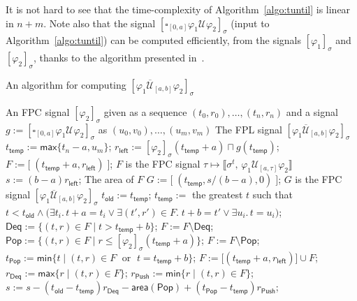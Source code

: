 \documentclass[envcountsect,orivec]{llncs} \usepackage{etex} \usepackage[]{graphicx}
\newcommand{\UntilOp}[1]{\mathbin{\mathcal{U}_{#1}}}
\newcommand{\TUntil}[1]{\mathbin{\overline{\mathcal{U}}_{#1}}}
\newcommand{\BoxOp}[1]{\square_{#1}}
\newcommand{\Robust}[2]{{ \llbracket #1,\, #2 \rrbracket}}
\newcommand{\Max}{\mathsf{max}}
\newcommand{\Min}{\mathsf{min}}
\begin{document}
It is not hard to see that the time-complexity of
Algorithm~\ref{algo:tuntil} is linear in $n+m$. Note also that the signal
$[\BoxOp{[0,a]} \varphi_1 \UntilOp{} \varphi_2]_{\sigma}$ 
(input to Algorithm~\ref{algo:tuntil}) can be computed
efficiently, from  
the signals $[\varphi_1]_{\sigma}$ and $[\varphi_2]_{\sigma}$,
thanks to the algorithm presented in~\cite{DBLP:conf/cav/DonzeFM13}.
\begin{algorithm}
  \caption{An algorithm for computing $[\varphi_1 \TUntil{[a,b]} \varphi_2]_{\sigma}$}
  \label{algo:tuntil}
  \begin{algorithmic}
    \Require An FPC signal $[\varphi_2]_{\sigma}$ 
    given as a sequence $(t_{0},r_{0}),\dotsc,(t_{n},r_{n})$
    and a signal $g := [\BoxOp{[0,a]} \varphi_1 \UntilOp{} \varphi_2]_{\sigma}$ 
    as $(u_{0},v_{0}),\dotsc,(u_{m},v_{m})$
    \Ensure The FPL signal
    $[\varphi_1 \TUntil{[a,b]} \varphi_2]_{\sigma}$
    \State $t_{\mathsf{temp}} := \Max \{t_n - a, u_m \}$;
    \State $r_{\mathsf{left}} := [\varphi_2]_{\sigma}(t_{\mathsf{temp}} + a) \sqcap g(t_{\mathsf{temp}})$;
    \State $F := \bigl[ \;(t_{\mathsf{temp}}+a, r_{\mathsf{left}}) \;\bigr]$; 
    \Comment $F$ is the FPC signal $\tau \mapsto \Robust{\sigma^t}{\varphi_1 \UntilOp{[a,\tau]} \varphi_2}$
\State $s := (b-a)r_{\mathsf{left}}$;
    \Comment The area of $F$
    \State $G := \bigl[ \;(t_{\mathsf{temp}}, s / (b-a), 0) \;\bigr]$; 
    \Comment $G$ is the FPC signal $[\varphi_1 \TUntil{[a,b]} \varphi_2]_{\sigma}$
    \State $t_{\mathsf{old}} := t_{\mathsf{temp}}$;
    \State $t_{\mathsf{temp}} :=$ the greatest $t$ such that 
    \State \qquad \qquad 
    $t < t_{\mathsf{old}} \wedge 
    \bigl(
    \exists t_i.\, t + a = t_i 
    \vee \exists (t', r') \in F. \; t+ b = t' 
    \vee \exists u_i.\, t = u_i \bigr)$;
\State $\mathsf{Deq} := \{(t, r) \in F \mid t > t_{\mathsf{temp}} + b\}$; 
    \State $F := F \setminus \mathsf{Deq}$;
\State $\mathsf{Pop} := \{(t, r) \in F \mid r \leq [\varphi_2]_{\sigma}(t_{\mathsf{temp}}+a) \}$; 
    \State $F := F \setminus \mathsf{Pop}$;
    \State $t_{\mathsf{Pop}} := \mathsf{min} \{t \mid(t,r) \in F \; \text{ or } \; t = t_{\mathsf{temp}} + b\}$;
    \State $F := \big[ (t_{\mathsf{temp}}+a, r_{\mathsf{left}})\big] \cup F$;
    \State $r_{\mathsf{Deq}} := \Max \{ r \mid (t,r) \in F\}$;
    \State $r_{\mathsf{Push}} := \Min \{ r \mid (t,r) \in F\}$;
    \State $s := s
    - (t_{\mathsf{old}} - t_{\mathsf{temp}})r_{\mathsf{Deq}} 
    - \mathsf{area}(\mathsf{Pop}) 
    + (t_{\mathsf{Pop}} - t_{\mathsf{temp}})r_{\mathsf{Push}}$;


\end{algorithmic}
\end{algorithm}
\end{document}
